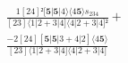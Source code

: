 \documentclass[varwidth, border=5pt]{standalone}
\begin{document}
\begin{my}
$\begin{gathered}
\scriptscriptstyle\frac{1[24]²[𝟓|𝟓|4⟩⟨4𝟓⟩s_{234}}{[23]⟨1|2+3|4]⟨4|2+3|4]²} +\\
\scriptscriptstyle\frac{-2[24][𝟓|𝟓|3+4|2]⟨4𝟓⟩}{[23]⟨1|2+3|4]⟨4|2+3|4]} \phantom{+}
\end{gathered}$
\end{my}
\end{document}
